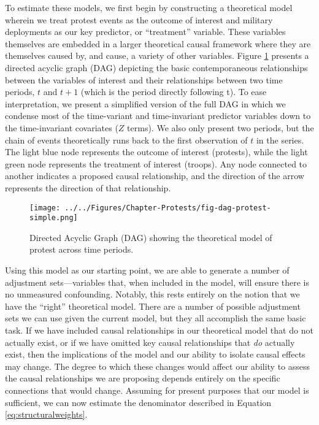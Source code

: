 To estimate these models, we first begin by constructing a theoretical model wherein we treat protest events as the outcome of interest and military deployments as our key predictor, or ``treatment'' variable. These variables themselves are embedded in a larger theoretical causal framework where they are themselves caused by, and cause, a variety of other variables. Figure \ref{fig:dagtroops} presents a directed acyclic graph (DAG) depicting the basic contemporaneous relationships between the variables of interest and their relationships between two time periods, $t$ and $t+1$ (which is the period directly following t). To ease interpretation, we present a simplified version of the full DAG in which we condense most of the time-variant and time-invariant predictor variables down to the time-invariant covariates ($Z$ terms). We also only present two periods, but the chain of events theoretically runs back to the first observation of $t$ in the series. The light blue node represents the outcome of interest (protests), while the light green node represents the treatment of interest (troops). Any node connected to another indicates a proposed causal relationship, and the direction of the arrow represents the direction of that relationship.

\begin{figure}[t]
	\centering\texttt{[image: ../../Figures/Chapter-Protests/fig-dag-protest-simple.png]}
	\caption{Directed Acyclic Graph (DAG) showing the theoretical model of protest across time periods.}
	\label{fig:dagtroops}
\end{figure}

Using this model as our starting point, we are able to generate a number of adjustment sets---variables that, when included in the model, will ensure there is no unmeasured confounding. Notably, this rests entirely on the notion that we have the ``right'' theoretical model. There are a number of possible adjustment sets we can use given the current model, but they all accomplish the same basic task. If we have included causal relationships in our theoretical model that do not actually exist, or if we have omitted key causal relationships that \textit{do} actually exist, then the implications of the model and our ability to isolate causal effects may change. The degree to which these changes would affect our ability to assess the causal relationships we are proposing depends entirely on the specific connections that would change. Assuming for present purposes that our model is sufficient, we can now estimate the denominator described in Equation \ref{eq:structuralweights}.

